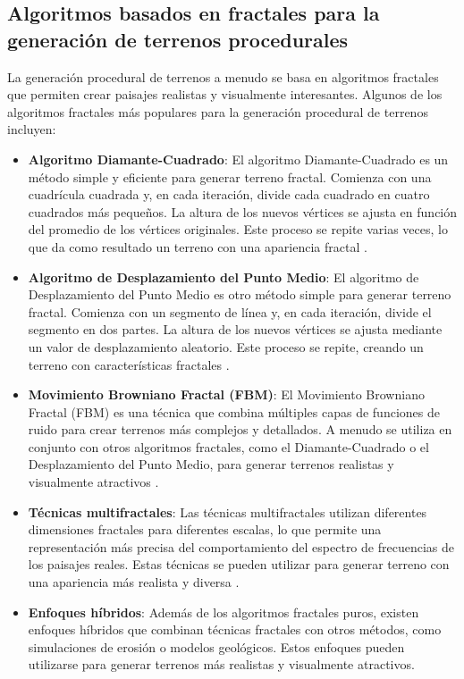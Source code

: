 \subsection{Algoritmos basados en fractales para la generación de terrenos procedurales}

La generación procedural de terrenos a menudo se basa en algoritmos fractales que permiten crear paisajes realistas y visualmente interesantes. Algunos de los algoritmos fractales más populares para la generación procedural de terrenos incluyen:

\begin{itemize}
    \item \textbf{Algoritmo Diamante-Cuadrado}: El algoritmo Diamante-Cuadrado es un método simple y eficiente para generar terreno fractal. Comienza con una cuadrícula cuadrada y, en cada iteración, divide cada cuadrado en cuatro cuadrados más pequeños. La altura de los nuevos vértices se ajusta en función del promedio de los vértices originales. Este proceso se repite varias veces, lo que da como resultado un terreno con una apariencia fractal \cite{DiamanteCuadrado}.
    
    \item \textbf{Algoritmo de Desplazamiento del Punto Medio}: El algoritmo de Desplazamiento del Punto Medio es otro método simple para generar terreno fractal. Comienza con un segmento de línea y, en cada iteración, divide el segmento en dos partes. La altura de los nuevos vértices se ajusta mediante un valor de desplazamiento aleatorio. Este proceso se repite, creando un terreno con características fractales \cite{DesplazamientoPuntoMedio}.
    
    \item \textbf{Movimiento Browniano Fractal (FBM)}: El Movimiento Browniano Fractal (FBM) es una técnica que combina múltiples capas de funciones de ruido para crear terrenos más complejos y detallados. A menudo se utiliza en conjunto con otros algoritmos fractales, como el Diamante-Cuadrado o el Desplazamiento del Punto Medio, para generar terrenos realistas y visualmente atractivos \cite{FractalBrownianoMotion}.
    
    \item \textbf{Técnicas multifractales}: Las técnicas multifractales utilizan diferentes dimensiones fractales para diferentes escalas, lo que permite una representación más precisa del comportamiento del espectro de frecuencias de los paisajes reales. Estas técnicas se pueden utilizar para generar terreno con una apariencia más realista y diversa \cite{TecnicasMultifractales}.
    
    \item \textbf{Enfoques híbridos}: Además de los algoritmos fractales puros, existen enfoques híbridos que combinan técnicas fractales con otros métodos, como simulaciones de erosión o modelos geológicos. Estos enfoques pueden utilizarse para generar terrenos más realistas y visualmente atractivos.
\end{itemize}

